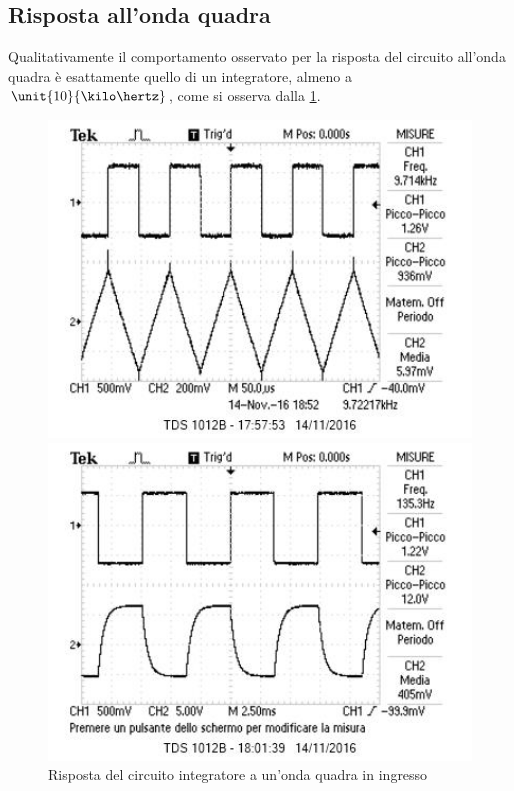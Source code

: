 \documentclass[10pt,a4paper]{article}
\begin{document}

\subsection{Risposta all'onda quadra}


Qualitativamente il comportamento osservato per la risposta del circuito all'onda quadra è esattamente quello di un integratore, almeno a $\unit{10}{\kilo\hertz}$, come si osserva dalla \figurename{\ref{fig:intsq}}.

\begin{figure}[h!]
	\begin{minipage}[t]{0.45\textwidth}
		\centering
		\includegraphics[width=1\textwidth]{../oscilloscopio/sqint.jpg}
	\end{minipage}
	\begin{minipage}[t]{0.45\textwidth}
		\centering
		\includegraphics[width=1\textwidth]{../oscilloscopio/sqexp.jpg}
	\end{minipage}
	\caption{Risposta del circuito integratore a un'onda quadra in ingresso}
	\label{fig:intsq}
\end{figure}
\end{document}
